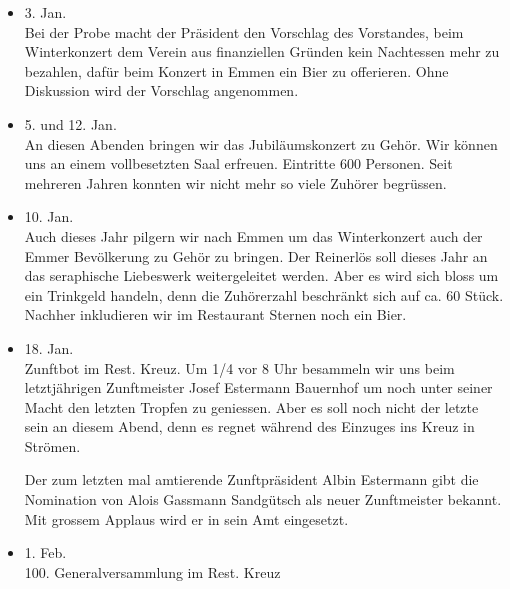 \begin{multicols}{2}


    \begin{itemize}
        \item[]3. Jan.\\
        Bei der Probe macht der Präsident den Vorschlag des Vorstandes, beim
        Winterkonzert dem Verein aus finanziellen Gründen kein Nachtessen mehr
        zu bezahlen, dafür beim Konzert in Emmen ein Bier zu offerieren. Ohne
        Diskussion wird der Vorschlag angenommen.

        \item[]5. und 12. Jan.\\
        An diesen Abenden bringen wir das Jubiläumskonzert zu Gehör. Wir können
        uns an einem vollbesetzten Saal erfreuen. Eintritte 600 Personen. Seit
        mehreren Jahren konnten wir nicht mehr so viele Zuhörer begrüssen.

        \item[]10. Jan.\\
        Auch dieses Jahr pilgern wir nach Emmen um das Winterkonzert auch der
        Emmer Bevölkerung zu Gehör zu bringen. Der Reinerlös soll dieses Jahr an
        das seraphische Liebeswerk weitergeleitet werden. Aber es wird sich
        bloss um ein Trinkgeld handeln, denn die Zuhörerzahl beschränkt sich auf
        ca. 60 Stück. Nachher inkludieren wir im Restaurant Sternen noch ein
        Bier.

        \item[]18. Jan.\\
        Zunftbot im Rest. Kreuz. Um 1/4 vor 8 Uhr besammeln wir uns beim
        letztjährigen Zunftmeister Josef Estermann Bauernhof um noch unter
        seiner Macht den letzten Tropfen zu geniessen. Aber es soll noch nicht
        der letzte sein an diesem Abend, denn es regnet während des Einzuges ins
        Kreuz in Strömen.

        Der zum letzten mal amtierende Zunftpräsident Albin Estermann gibt die
        Nomination von Alois Gassmann Sandgütsch als neuer Zunftmeister bekannt.
        Mit grossem Applaus wird er in sein Amt eingesetzt.

        \item[]1. Feb.\\
        100. Generalversammlung im Rest. Kreuz


\end{itemize}
\end{multicols}
